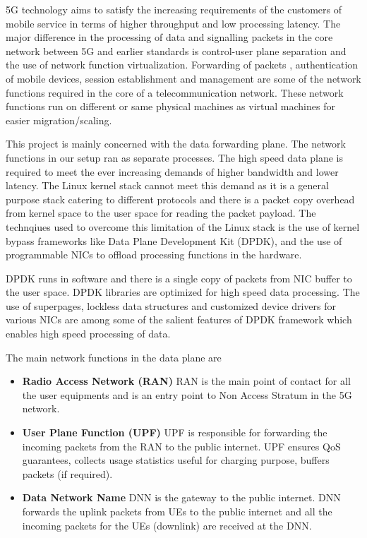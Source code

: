 5G technology aims to satisfy the increasing requirements of the customers of mobile service 
in terms of higher throughput and low processing latency. 
The major difference in  the processing of data and signalling packets in the core network between 5G and earlier standards is control-user plane 
separation and the use of network function virtualization. Forwarding of packets , 
authentication of mobile devices, session establishment and management  are some of the network functions required in the core of a telecommunication network. 
These network functions run on different or same physical machines as 
virtual machines for easier migration/scaling. 

This project is mainly concerned with the data forwarding plane. The network functions in our setup ran as separate processes.
The high speed data plane is required to meet the ever increasing demands of higher bandwidth and lower latency. The Linux kernel stack cannot meet this demand as it is a general purpose stack catering to different protocols and there is a packet copy overhead from kernel space to the user space for reading the packet payload. The technqiues used to overcome this limitation of the Linux stack is the use of kernel bypass frameworks like Data Plane Development Kit (DPDK), and the use of programmable NICs to offload processing functions in the hardware. 

DPDK runs in software and there is a single copy of packets from NIC buffer to the
 user space. DPDK libraries are optimized for high speed data processing. The use
  of superpages, lockless data structures and customized device drivers for
   various NICs are among some of the salient features of DPDK framework which
   enables high speed processing of data.

   The main network functions in the data plane are 
   \begin{itemize}
	   \item \textbf{Radio Access Network (RAN)} RAN is the main point of contact for all the user equipments and is an entry point to Non Access Stratum in the 5G network.
	   \item \textbf{User Plane Function (UPF)}
	   UPF is responsible for forwarding the incoming packets from the RAN to the public internet. UPF ensures QoS guarantees, collects usage statistics useful for charging purpose, buffers packets (if required).
	   
	   \item \textbf{Data Network Name}
	   DNN is the gateway to the public internet. DNN forwards the uplink packets from UEs to the public internet and all the incoming packets for the UEs (downlink) are received at the DNN.
   \end{itemize}
  
